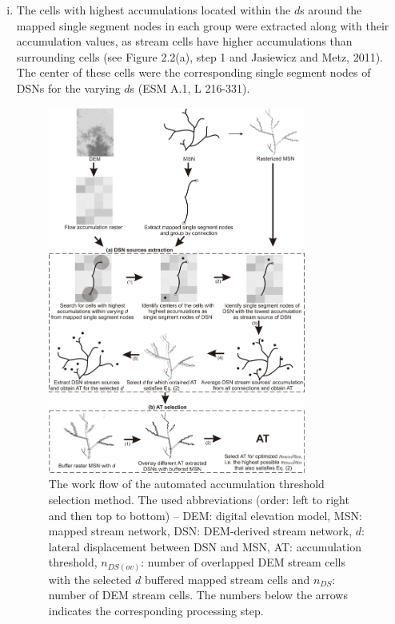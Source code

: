 \begin{enumerate}[(i)]

\item The cells with highest accumulations located within the $d$s around the mapped single segment nodes in each group were extracted along with their accumulation values, as stream cells have higher accumulations than surrounding cells (see Figure 2.2(a), step 1 and Jasiewicz and Metz, 2011). The center of these cells were the corresponding single segment nodes of DSNs for the varying $d$s (ESM A.1, L 216-331).

\noindent\begin{figure}[h!]
  \centering
  \includegraphics[width=0.8\textwidth]{Figures/Fig_2_2.png}
  \caption{The work flow of the automated accumulation threshold selection method. The used abbreviations (order: left to right and then top to bottom) – DEM: digital elevation model, MSN: mapped stream network, DSN: DEM-derived  stream network, $d$: lateral displacement between DSN and MSN, AT: accumulation threshold, $n_{DS(ov)}$: number of overlapped DEM stream cells with the selected $d$ buffered mapped stream cells and $n_{DS}$: number of DEM stream cells. The numbers below the arrows indicates the corresponding processing step.}
  \label{Fig_2_2}
\end{figure}\vspace{-0.5cm}


\end{enumerate}
